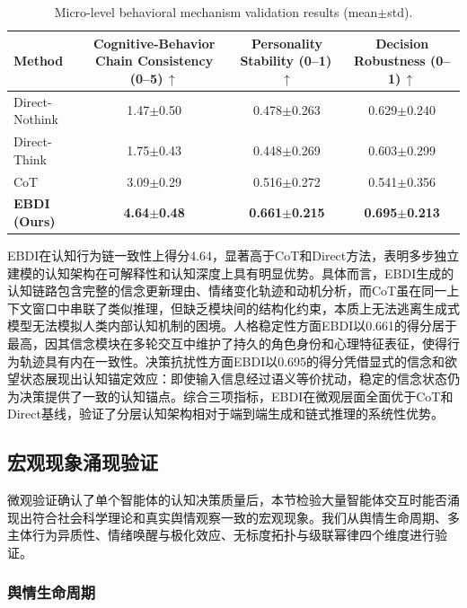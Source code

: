 \documentclass[a4paper,fleqn]{cas-sc}
\newcommand{\best}[1]{\textbf{#1}}
\begin{document}
\begin{table}[!t]
\centering
\caption{Micro-level behavioral mechanism validation results (mean$\pm$std).}
\label{tab:micro}
\small
\renewcommand{\arraystretch}{1.05}
\begin{tabular}{@{}lccc@{}}
\toprule
\textbf{Method} & \makecell{\textbf{Cognitive-Behavior}\\\textbf{Chain Consistency} (0--5)\,$\uparrow$} & \makecell{\textbf{Personality}\\\textbf{Stability} (0--1)\,$\uparrow$} & \makecell{\textbf{Decision}\\\textbf{Robustness} (0--1)\,$\uparrow$} \\
\midrule
Direct-Nothink & 1.47$\pm$0.50 & 0.478$\pm$0.263 & 0.629$\pm$0.240 \\
Direct-Think & 1.75$\pm$0.43 & 0.448$\pm$0.269 & 0.603$\pm$0.299 \\
CoT & 3.09$\pm$0.29 & 0.516$\pm$0.272 & 0.541$\pm$0.356 \\
\rowcolor{grayrow}
\textbf{EBDI (Ours)} & \best{4.64$\pm$0.48} & \best{0.661$\pm$0.215} & \best{0.695$\pm$0.213} \\
\bottomrule
\end{tabular}
\end{table}

EBDI在认知行为链一致性上得分4.64，显著高于CoT和Direct方法，表明多步独立建模的认知架构在可解释性和认知深度上具有明显优势。具体而言，EBDI生成的认知链路包含完整的信念更新理由、情绪变化轨迹和动机分析，而CoT虽在同一上下文窗口中串联了类似推理，但缺乏模块间的结构化约束，本质上无法逃离生成式模型无法模拟人类内部认知机制的困境。人格稳定性方面EBDI以0.661的得分居于最高，因其信念模块在多轮交互中维护了持久的角色身份和心理特征表征，使得行为轨迹具有内在一致性。决策抗扰性方面EBDI以0.695的得分凭借显式的信念和欲望状态展现出认知锚定效应：即使输入信息经过语义等价扰动，稳定的信念状态仍为决策提供了一致的认知锚点。综合三项指标，EBDI在微观层面全面优于CoT和Direct基线，验证了分层认知架构相对于端到端生成和链式推理的系统性优势。

\subsection{宏观现象涌现验证}

微观验证确认了单个智能体的认知决策质量后，本节检验大量智能体交互时能否涌现出符合社会科学理论和真实舆情观察一致的宏观现象。我们从舆情生命周期、多主体行为异质性、情绪唤醒与极化效应、无标度拓扑与级联幂律四个维度进行验证。

\subsubsection{舆情生命周期}
\end{document}
